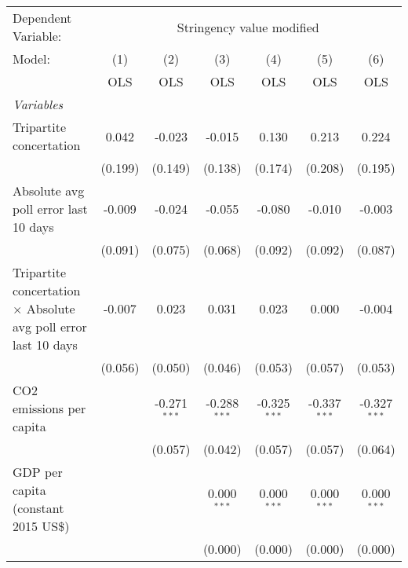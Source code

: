 
\begingroup
\centering
\begin{tabular}{lcccccc}
   \toprule
   Dependent Variable: & \multicolumn{6}{c}{Stringency value modified}\\
   Model:                                                                 & (1)     & (2)            & (3)            & (4)            & (5)            & (6)\\  
                                                                          &  OLS    & OLS            & OLS            & OLS            & OLS            & OLS\\  
   \midrule
   \emph{Variables}\\
   Tripartite concertation                                                & 0.042   & -0.023         & -0.015         & 0.130          & 0.213          & 0.224\\   
                                                                          & (0.199) & (0.149)        & (0.138)        & (0.174)        & (0.208)        & (0.195)\\   
   Absolute avg poll error last 10 days                                   & -0.009  & -0.024         & -0.055         & -0.080         & -0.010         & -0.003\\   
                                                                          & (0.091) & (0.075)        & (0.068)        & (0.092)        & (0.092)        & (0.087)\\   
   Tripartite concertation $\times$ Absolute avg poll error last 10 days  & -0.007  & 0.023          & 0.031          & 0.023          & 0.000          & -0.004\\   
                                                                          & (0.056) & (0.050)        & (0.046)        & (0.053)        & (0.057)        & (0.053)\\   
   CO2 emissions per capita                                               &         & -0.271$^{***}$ & -0.288$^{***}$ & -0.325$^{***}$ & -0.337$^{***}$ & -0.327$^{***}$\\   
                                                                          &         & (0.057)        & (0.042)        & (0.057)        & (0.057)        & (0.064)\\   
   GDP per capita (constant 2015 US\$)                                    &         &                & 0.000$^{***}$  & 0.000$^{***}$  & 0.000$^{***}$  & 0.000$^{***}$\\   
                                                                          &         &                & (0.000)        & (0.000)        & (0.000)        & (0.000)\\   

\end{tabular}
